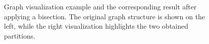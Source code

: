 \begin{figure}[h!]
\begin{subfigure}[b]{0.23\textwidth}
        \label{fig:visu_2part}
    \end{subfigure}
    \caption{Graph visualization example and the corresponding result after applying
    a bisection. The original graph structure is shown on the left, while the right 
    visualization highlights the two obtained partitions.}
    \label{fig:visu}
\end{figure}